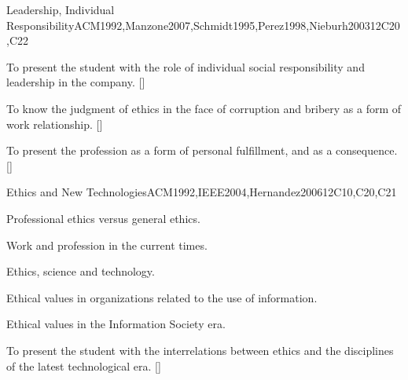 \begin{syllabus}
\begin{unit}{}{Leadership, Individual Responsibility}{ACM1992,Manzone2007,Schmidt1995,Perez1998,Nieburh2003}{12}{C20,C22}
\begin{topics}
\end{topics}
\begin{learningoutcomes}
	\item To present the student with the role of individual social responsibility and leadership in the company. [\Familiarity]
	\item To know the judgment of ethics in the face of corruption and bribery as a form of work relationship. [\Familiarity]
	\item To present the profession as a form of personal fulfillment, and as a consequence. []
\end{learningoutcomes}
\end{unit}

\begin{unit}{}{Ethics and New Technologies}{ACM1992,IEEE2004,Hernandez2006}{12}{C10,C20,C21}
\begin{topics}
	\item Professional ethics versus general ethics.
	\item Work and profession in the current times.
	\item Ethics, science and technology.
	\item Ethical values in organizations related to the use of information.
	\item Ethical values in the Information Society era.
\end{topics}
\begin{learningoutcomes}
	\item To present the student with the interrelations between ethics and the disciplines of the latest technological era. [\Familiarity]
\end{learningoutcomes}
\end{unit}


\end{syllabus}
